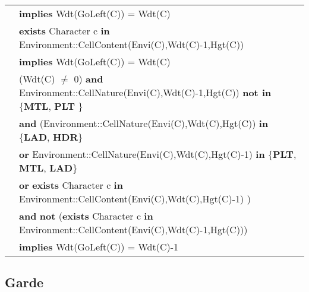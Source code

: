\documentclass{article}
\begin{document}
\begin{tabular}{rl}
& \quad\quad \textbf{implies} \textrm{Wdt(GoLeft(C))} = \textrm{Wdt(C)} \\
& \textbf{exists} \textrm{Character} c \textbf{in} \textrm{Environment::CellContent(Envi(C),Wdt(C)-1,Hgt(C))} \\ & \quad\quad \textbf{implies} \textrm{Wdt(GoLeft(C))} = \textrm{Wdt(C)} \\
& (\textrm{Wdt(C)} $\neq$ 0) \textbf{and} \textrm{Environment::CellNature(Envi(C),Wdt(C)-1,Hgt(C))} \textbf{not in} \{\textbf{MTL}, \textbf{PLT} \} \\
& \quad\quad \textbf{and} (\textrm{Environment::CellNature(Envi(C),Wdt(C),Hgt(C))} \textbf{in} \{\textbf{LAD}, \textbf{HDR}\} \\
& \quad\quad\quad\quad \textbf{or} \textrm{Environment::CellNature(Envi(C),Wdt(C),Hgt(C)-1)} \textbf{in} \{\textbf{PLT}, \textbf{MTL}, \textbf{LAD}\} \\
& \quad\quad\quad\quad \textbf{or} \textbf{exists} \textrm{Character} c \textbf{in} \textrm{Environment::CellContent(Envi(C),Wdt(C),Hgt(C)-1)} ) \\
& \quad\quad \textbf{and} \textbf{not} (\textbf{exists} \textrm{Character} c \textbf{in} \textrm{Environment::CellContent(Envi(C),Wdt(C)-1,Hgt(C))}) \\
& \quad\quad \textbf{implies} \textrm{Wdt(GoLeft(C))} = \textrm{Wdt(C)}-1
\end{tabular}

\subsection*{Garde}
\end{document}
